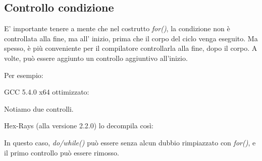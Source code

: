 \subsection{Controllo condizione}

E' importante tenere a mente che nel costrutto \emph{for()}, la condizione non è controllata alla fine, ma all' inizio, prima che il corpo del ciclo venga eseguito.
Ma spesso, è più conveniente per il compilatore controllarla alla fine, dopo il corpo.
A volte, può essere aggiunto un controllo aggiuntivo all'inizio.

Per esempio:



GCC 5.4.0 x64 ottimizzato:



Notiamo due controlli.

Hex-Rays (alla versione 2.2.0) lo decompila così:



In questo caso, \emph{do/while()} può essere senza alcun dubbio rimpiazzato con \emph{for()}, e il primo controllo può essere rimosso.

